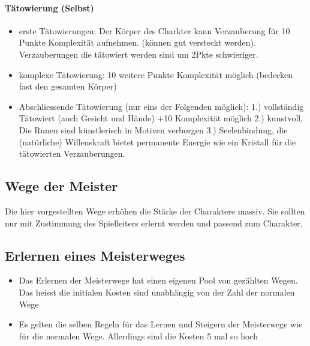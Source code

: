 \documentclass{article}
\begin{document}
\paragraph{Tätowierung (Selbst)}

\begin{itemize}
\item erste Tätowierungen: Der Körper des Charkter kann Verzauberung für 10 Punkte Komplexität aufnehmen. (können gut versteckt werden). Verzauberungen die tätowiert werden sind um 2Pkte schwieriger. 
\item komplexe Tätowierung: 10 weitere Punkte Komplexität möglich (bedecken fast den gesamten Körper)
\item Abschliessende Tätowierung (nur eins der Folgenden möglich): 1.) vollständig Tätowiert (auch Gesicht und Hände) +10 Komplexität möglich 2.) kunstvoll, Die Runen sind künstlerisch in Motiven verborgen 3.) Seelenbindung, die (natürliche) Willenskraft bietet permanente Energie wie ein Kristall für die tätowierten Verzauberungen.
\end{itemize}

\begin{center}
\section{Wege der Meister}
\end{center}

Die hier vorgestellten Wege erhöhen die Stärke der Charaktere massiv. Sie sollten nur mit Zustimmung des Spielleiters
erlernt werden und passend zum Charakter.

\begin{center}
\subsection{Erlernen eines Meisterweges}
\end{center}

\begin{itemize}
\item Das Erlernen der Meisterwege hat einen eigenen Pool von gezählten Wegen. Das heisst die initialen Kosten sind unabhängig von der Zahl der normalen Wege
\item Es gelten die selben Regeln für das Lernen und Steigern der Meisterwege wie für die normalen Wege. Allerdings sind die Kosten 5 mal so hoch
\end{itemize}
\end{document}
